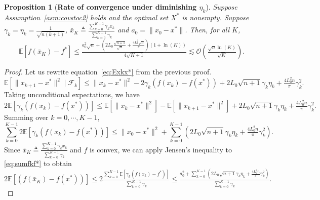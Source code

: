 \documentclass[11pt,reqno]{amsart}
\newcommand{\1}{{\bf 1}}
\newcommand{\2}{{\bf 2}}
\newcommand{\mr}[1]{{\color{blue}#1}}
\numberwithin{equation}{section}
\newtheorem{proposition}{Proposition}[section]
\theoremstyle{remark}
\begin{document}
{		\begin{proposition}[{\bf Rate of convergence under diminishing $\eta_k$}]\label{prop:convex_zogd_rate}
			Suppose Assumption~\ref{asm:covstoc2} %
			holds and the optimal set $X^*$ is nonempty. Suppose $\gamma_k=\eta_k=\tfrac{1}{\sqrt{n(k+1)}}$,  $\bar{x}_{K} \triangleq \tfrac{\sum_{k=0}^{{K-1}} \gamma_{k} x_{k}}{\sum_{k=0}^{{K-1}}\gamma_{k}}$ and $a_0=\|x_0-x^*\|$. Then, for all $K$,
			\begin{equation*}
				\mathbb{E}\left[f\left(\bar{x}_{K}\right)-f^{*}\right] \leq 
				\tfrac{a_{0}^{2}{\sqrt{n}}+\left(2L_0{\frac{\sqrt{n+1}}{\sqrt{n}}}+\frac{4L_0^2{\sqrt{n}}}{ \pi}\right)\left(1+\ln ({K})\right)}{{4} \sqrt{K+{1}}}
				\lesssim \mathcal{O}\left(\tfrac{\sqrt{n} \ln(K)}{\sqrt{K}}\right).
			\end{equation*}
		\end{proposition}
		\begin{proof}
		Let us rewrite equation~\eqref{eq:Exkx*} from the previous proof.
		\begin{equation*}
			\mathbb{E}[\|x_{k+1}-x^*\|^2 \mid \mathcal{F}_k] \leq  \|x_k-x^*\|^2-2\gamma_k \left(f(x_k)-f(x^*)\right)+2L_0\sqrt{n+1}\gamma_k\eta_k+\tfrac{4L_0^2n}{\pi}\gamma_k^2.
		\end{equation*}
		Taking unconditional expectations, we have
		\begin{equation*}
			2\mathbb{E}[\gamma_k \left(f(x_k)-f(x^*)\right)] \leq  \mathbb{E}[\|x_{k}-x^*\|^2 ]-\mathbb{E}[\|x_{k+1}-x^*\|^2 ]+2L_0\sqrt{n+1}\gamma_k\eta_k+ \tfrac{4L_0^2n}{\pi}\gamma_k^2.
		\end{equation*}
		Summing over $k=0,\cdots, {K-1}$,
		\begin{equation}\label{eq:sumfkf*}
			\sum_{k=0}^{{K-1}}2\mathbb{E}[\gamma_k \left(f(x_k)-f(x^*)\right)] \leq \|x_{0}-x^*\|^2 +\sum_{k=0}^{{K-1}}\left(2L_0\sqrt{n+1}\gamma_k\eta_k+\tfrac{4L_0^2n}{\pi}\gamma_k^2\right).
		\end{equation}
		Since $\bar{x}_{K} \triangleq \tfrac{\sum_{k=0}^{{K-1}} \gamma_{k} x_{k}}{\sum_{k=0}^{{K-1}}\gamma_{k}}$ and $f$ is convex, we can apply Jensen's inequality to \eqref{eq:sumfkf*} to obtain
		\begin{equation}\label{eq:ieqfkf*}
			2\mathbb{E}[\left(f(\bar{x}_K)-f(x^*)\right)] \leq 2 \tfrac{\sum_{k=0}^{{K-1}} \mathbb{E}\left[\gamma_{k}\left(f\left(x_{k}\right)-f^{*}\right)\right]}{\sum_{k=0}^{{K-1}} \gamma_{k}} \leq \tfrac{a_{0}^{2}+ \sum_{k=0}^{{K-1}}\left(2L_0\sqrt{n+1}\gamma_k\eta_k+\frac{4L_0^2n}{ \pi}\gamma_k^2\right)}{\sum_{k=0}^{{K-1}} \gamma_{k}} .

\end{equation}
\end{proof}}
\end{document}
